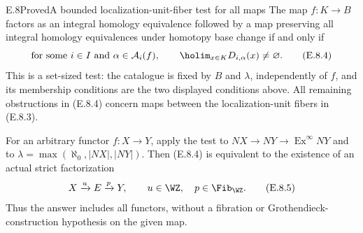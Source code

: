 \begin{claim}{E.8}{Proved}{A bounded localization-unit-fiber test for all maps}
The map $f:K\to B$ factors as an integral homology equivalence
followed by a map preserving all integral homology equivalences
under homotopy base change if and only if
\[
 \text{for some }i\in I\text{ and }\alpha\in\mathcal A_i(f),
       \qquad \holim_{x\in K}D_{i,\alpha}(x)\ne\varnothing .
                                                               \tag{E.8.4}
\]
This is a set-sized test: the catalogue is fixed by $B$ and
$\lambda$, independently of $f$, and its membership conditions are
the two displayed conditions above. All remaining obstructions in
(E.8.4) concern maps between the localization-unit fibers in
(E.8.3).

For an arbitrary functor $f:X\to Y$, apply the test to
$NX\to NY\to\operatorname{Ex}^{\infty}NY$ and to
$\lambda=\max(\aleph_0,|NX|,|NY|)$. Then (E.8.4) is equivalent
to the existence of an actual strict factorization
\[
                X\xrightarrow{u}E\xrightarrow{p}Y,
                  \qquad u\in\WZ,\quad p\in\Fib_{\WZ}.
                                                               \tag{E.8.5}
\]
Thus the answer includes all functors, without a fibration or
Grothendieck-construction hypothesis on the given map.
\end{claim}
